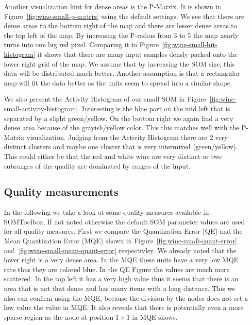 \documentclass{acm_proc_article-sp}
\begin{document}
Another visualization hint for dense areas is the P-Matrix. It is shown in Figure~\ref{fig:wine-small-p-matrix} using
the default settings. We see that there are dense areas to the bottom right of the map and there are lesser
dense areas to the top left of the map.
By increasing the P-radius from 3 to 5 the map nearly turns into one big red pixel.
Comparing it to Figure~\ref{fig:wine-small-hit-histogram} it shows that there are many input samples densly packed
onto the lower right grid of the map. We assume that by increasing the SOM size, this data will be distributed much better. Another assumption is that a rectangular map will fit the data better as the units seem to spread into a similar shape.

We also present the Activity Histogram of our small SOM in Figure~\ref{fig:wine-small-activity-histogram}.
Interesting is the blue part on the mid left that is separated by a slight green/yellow.
On the bottom right we again find a very dense area because of the grayish/yellow color. This this matches
well with the P-Matrix visualization. Judging from the Activity Histogram there are 2 very distinct clusters
and maybe one cluster that is very intermixed (green/yellow). This could either be that the
red and white wine are very distinct or two subranges of the quality are dominated by ranges of the input.

\subsection{Quality measurements}

In the following we take a look at some quality measures available in SOMToolbox.
If not noted otherwise the default SOM parameter values are used for all quality measures.
First we compare the Quantization Error (QE) and the Mean Quantization Error (MQE) shown in
Figure~\ref{fig:wine-small-quant-error} and~\ref{fig:wine-small-mean-quant-error} respectivley.
We already noted that the lower right is a very dense area. In the MQE these units have a very low
MQE rate thus they are colored blue. In the QE Figure the values are much more scattered. In
the top left it has a very high value thus it seems that there is an area that is not that dense
and has many items with a long distance. This we also can confirm using the MQE, because the division
by the nodes does not set a low value the value in MQE. It also reveals that there is potentially even a more sparse
region as the node at position $1\times1$ in MQE shows.
\end{document}

